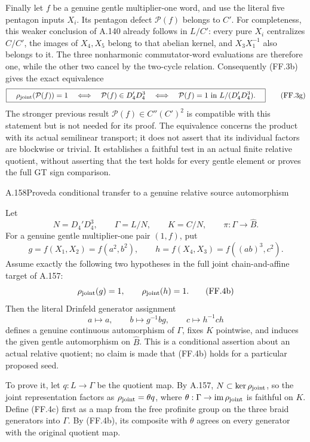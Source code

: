Finally let $f$ be a genuine gentle multiplier-one word,
and use the literal five pentagon inputs $X_i$. Its
pentagon defect $\mathcal P(f)$ belongs to $C'$.
For completeness, this weaker conclusion of A.140
already follows in $L/C'$: every pure $X_i$ centralizes
$C/C'$, the images of $X_4,X_5$ belong to that abelian
kernel, and $X_3X_1^{-1}$ also belongs to it.
The three nonharmonic commutator-word evaluations are
therefore one, while the other two cancel by the
two-cycle relation. Consequently (FF.3b) gives the
exact equivalence
\[
 \boxed{\quad
 \rho_{\rm joint}(\mathcal P(f))=1
 \quad\Longleftrightarrow\quad
 \mathcal P(f)\in D_4'D_4^3
 \quad\Longleftrightarrow\quad
 \mathcal P(f)=1\text{ in }L/(D_4'D_4^3).\quad}
 \tag{FF.3g}
\]
The stronger previous result $\mathcal P(f)\in
C''(C')^2$ is compatible with this statement but is
not needed for its proof. The equivalence concerns
the product with its actual semilinear transport;
it does not assert that its individual factors are
blockwise or trivial. It establishes a faithful
test in an actual finite relative quotient, without
asserting that the test holds for every gentle
element or proves the full GT sign comparison.

\begin{statement}{A.158}{Proved}{a conditional transfer to a genuine relative source automorphism}
\end{statement}
Let
\[
 N=D_4'D_4^3,\qquad \Gamma=L/N,\qquad K=C/N,
 \qquad \pi:\Gamma\longrightarrow\widehat B.
 \tag{FF.4a}
\]
For a genuine gentle multiplier-one pair $(1,f)$, put
\[
 g=f(X_1,X_2)=f(a^2,b^2),\qquad
 h=f(X_4,X_3)=f((ab)^3,c^2).
\]
Assume exactly the following two hypotheses in the full joint
chain-and-affine target of A.157:
\[
             \rho_{\rm joint}(g)=1,
             \qquad \rho_{\rm joint}(h)=1.
 \tag{FF.4b}
\]
Then the literal Drinfeld generator assignment
\[
        a\longmapsto a,\qquad
        b\longmapsto g^{-1}bg,\qquad
        c\longmapsto h^{-1}ch
 \tag{FF.4c}
\]
defines a genuine continuous automorphism of $\Gamma$, fixes
$K$ pointwise, and induces the given gentle automorphism on
$\widehat B$. This is a conditional assertion about an actual
relative quotient; no claim is made that (FF.4b) holds for a
particular proposed seed.

To prove it, let $q:L\to\Gamma$ be the quotient map. By A.157,
$N\subset\ker\rho_{\rm joint}$, so the joint representation
factors as $\rho_{\rm joint}=\theta q$, where
$\theta:\Gamma\to\operatorname{im}\rho_{\rm joint}$ is
faithful on $K$. Define (FF.4c) first as a map from the free
profinite group on the three braid generators into $\Gamma$.
By (FF.4b), its composite with $\theta$ agrees on every
generator with the original quotient map.

